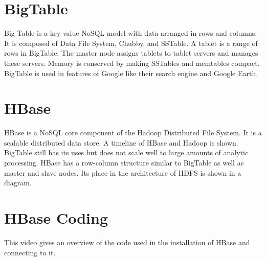 

\section{BigTable}

Big Table is a key-value NoSQL model with data arranged in rows and
columns. It is composed of Data File System, Chubby, and SSTable. A
tablet is a range of rows in BigTable. The master node assigns tablets
to tablet servers and manages these servers. Memory is conserved by
making SSTables and memtables compact. BigTable is used in features of
Google like their search engine and Google Earth.




\section{HBase}

HBase is a NoSQL core component of the Hadoop Distributed File System.
It is a scalable distributed data store. A timeline of HBase and
Hadoop is shown. BigTable still has its uses but does not scale well
to large amounts of analytic processing. HBase has a row-column
structure similar to BigTable as well as master and slave nodes. Its
place in the architecture of HDFS is shown in a diagram.




\section{HBase Coding}

This video gives an overview of the code used in the installation of
HBase and connecting to it.


